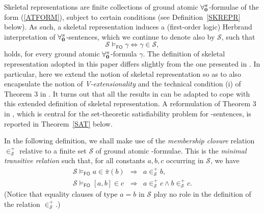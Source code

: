\documentclass[a4paper]{llncs}
\newcommand{\memclosure}[1]{\in_{#1}^{+}}
\newcommand{\pairin}[3]{\left[#1,#2\right] \in #3}
\newcommand{\nonpairin}[2]{#1 \in \bar{\pi}(#2)}
\newcommand{\atset}{\mathcal{S}}
\newcommand{\consta}{a}
\newcommand{\constb}{b}
\newcommand{\constc}{c}
\newcommand{\fomodels}[2]{#1 \models_{\mathsf{FO}} #2}
\begin{document}
Skeletal representations are finite collections of ground atomic
$\mathbf{\forall_{0}^{\pi}}$-formulae of the form (\ref{ATFORM}), subject to 
certain conditions (see Definition~\ref{SKREPR} below). As such, a 
skeletal representation induces a (first-order logic) Herbrand 
interpretation of $\mathbf{\forall_{0}^{\pi}}$-sentences, which we continue to 
denote also by $\atset$, such that
\[
  \fomodels{\atset}{\gamma} \iff \gamma \in \atset ,
\]
holds, for every ground atomic $\mathbf{\forall_{0}^{\pi}}$-formula $\gamma$.
%
The definition of skeletal representation adopted in this paper
differs slightly from the one presented in \cite{CanLonNic2011}.  In
particular, here we extend the notion of skeletal representation so as
to also encapsulate the notion of \emph{V-extensionality} and the
technical condition (i) of Theorem 3 in \cite{CanLonNic2011}.
It turns out that all the results in \cite{CanLonNic2011}
can be adapted to cope with this extended definition of skeletal
representation.
A reformulation of Theorem 3 in \cite{CanLonNic2011}, which is central
for the set-theoretic satisfiability problem for \Forallpizero-sentences,
is reported in Theorem~\ref{SAT} below.

In the following definition, we shall make use of the \emph{membership
closure} relation $\memclosure{\atset}$ relative to a finite set 
$\atset$ of ground atomic \Forallpizero-formulae. This is the 
\emph{minimal transitive relation} such that, for all constants 
$\consta, \constb, \constc$
occurring in $\atset$, we have
\[
  \begin{array}{rcl}
   \fomodels{\atset}{\nonpairin{\consta}{\constb}} & \Longrightarrow & 
\consta \memclosure{\atset} \constb ,\\
   \fomodels{\atset}{\pairin{\consta}{\constb}{\constc}} & 
\Longrightarrow & \consta \memclosure{\atset} \constc \wedge \constb 
\memclosure{\atset} \constc .
  \end{array}
\]
(Notice that equality clauses of type $a = b$ in $\atset$ play no 
role in the definition of the relation $\memclosure{\atset}$.)
%
\end{document}
